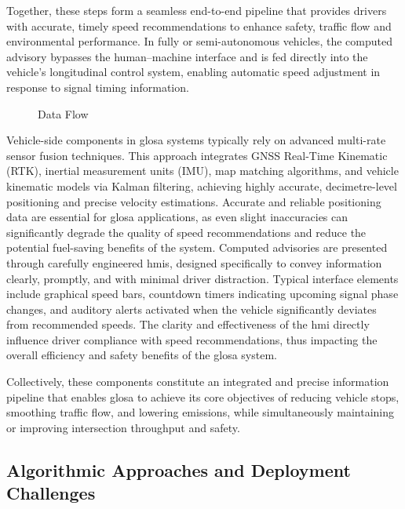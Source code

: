 Together, these steps form a seamless end-to-end pipeline that provides drivers with accurate, timely speed recommendations to enhance safety, traffic flow and environmental performance. In fully or semi-autonomous vehicles, the computed advisory bypasses the human–machine interface and is fed directly into the vehicle’s longitudinal control system, enabling automatic speed adjustment in response to signal timing information.

\begin{figure}[htbp]
  \centering
  \caption{Data Flow}
  \label{fig:glosa_architecture}
\end{figure}

Vehicle-side components in \ac{glosa} systems typically rely on advanced multi-rate sensor fusion techniques. This approach integrates GNSS Real-Time Kinematic (RTK), inertial measurement units (IMU), \ac{map} matching algorithms, and vehicle kinematic models via Kalman filtering, achieving highly accurate, decimetre-level positioning and precise velocity estimations. Accurate and reliable positioning data are essential for \ac{glosa} applications, as even slight inaccuracies can significantly degrade the quality of speed recommendations and reduce the potential fuel-saving benefits of the system. \cite{Vignarca2023} Computed advisories are presented through carefully engineered \acp{hmi}, designed specifically to convey information clearly, promptly, and with minimal driver distraction. Typical interface elements include graphical speed bars, countdown timers indicating upcoming signal phase changes, and auditory alerts activated when the vehicle significantly deviates from recommended speeds. The clarity and effectiveness of the \ac{hmi} directly influence driver compliance with speed recommendations, thus impacting the overall efficiency and safety benefits of the \ac{glosa} system.

Collectively, these components constitute an integrated and precise information pipeline that enables \ac{glosa} to achieve its core objectives of reducing vehicle stops, smoothing traffic flow, and lowering emissions, while simultaneously maintaining or improving intersection throughput and safety.


\subsection{Algorithmic Approaches and Deployment Challenges}
\label{subsec:glosa_algorithms_challenges}

